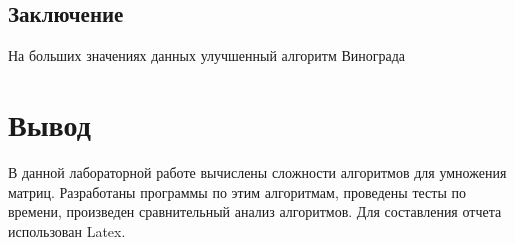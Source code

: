 \documentclass[12pt]{article}
\begin{document}
\subsection{Заключение}
На больших значениях данных улучшенный алгоритм Винограда 
\section{Вывод}
В данной лабораторной работе вычислены сложности алгоритмов для умножения матриц. Разработаны программы по этим алгоритмам, проведены тесты по времени, произведен сравнительный анализ алгоритмов. Для составления отчета использован Latex.
\\
\end{document}
